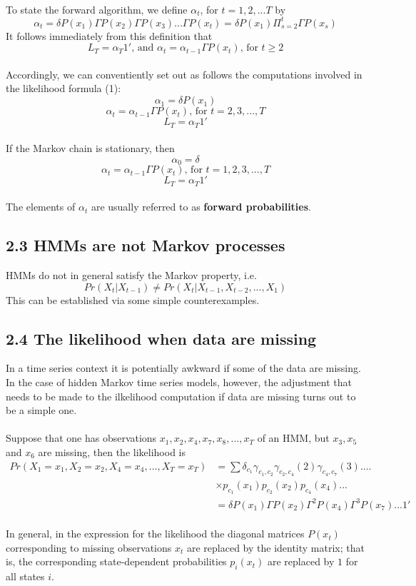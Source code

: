 \documentclass{article}
\begin{document}
\\
To state the forward algorithm, we define $\alpha_t$, for $t =1, 2, ... T$ by 
$$\alpha_t = \delta P(x_1) \Gamma P(x_2) \Gamma P(x_3) ... \Gamma P(x_t) = \delta P(x_1) \Pi_{s=2}^t \Gamma P(x_s)$$
It follows immediately from this definition that
$$L_T = \alpha_T 1' \text{, and } \alpha_t = \alpha_{t-1}\Gamma P(x_t) \text{, for } t \geq 2$$
\\
Accordingly, we can conventiently set out as follows the computations involved in the likelihood formula (1):
$$\alpha_1 = \delta P(x_1)$$
$$\alpha_t = \alpha_{t-1} \Gamma P(x_t) \text{, for } t = 2, 3, ..., T$$
$$L_T = \alpha_T 1'$$
\\
If the Markov chain is stationary, then 
$$\alpha_0 = \delta$$
$$\alpha_t = \alpha_{t-1} \Gamma P(x_t) \text{, for } t = 1, 2, 3, ..., T$$
$$L_T = \alpha_T 1'$$
\\
The elements of $\alpha_t$ are usually referred to as \textbf{forward probabilities}.

\subsection*{2.3 HMMs are not Markov processes}

HMMs do not in general satisfy the Markov property, i.e. 
$$Pr(X_t | X_{t-1}) \neq Pr(X_t | X_{t-1}, X_{t-2}, ... ,X_1)$$
This can be established via some simple counterexamples.

\subsection*{2.4 The likelihood when data are missing}
In a time series context it is potentially awkward if some of the data are missing. In the case of hidden Markov time series models, however, the adjustment that needs to be made to the ilkelihood computation if data are missing turns out to be a simple one. \\
\\
Suppose that one has observations $x_1, x_2, x_4, x_7, x_8, ..., x_T$ of an HMM, but $x_3, x_5$ and $x_6$ are missing, then the likelihood is 
\begin{align}
Pr(X_1 = x_1, X_2 = x_2, X_4 = x_4, ..., X_T = x_T) & = \sum \delta_{c_1} \gamma_{c_1, c_2} \gamma_{c_2, c_4}(2) \gamma_{c_4, c_7} (3) .... \\
& \times p_{c_1}(x_1) p_{c_2}(x_2) p_{c_4}(x_4)... \\
& = \delta P(x_1) \Gamma P(x_2) \Gamma^2 P(x_4) \Gamma^3 P(x_7) ... 1'
\end{align}
\\
In general, in the expression for the likelihood the diagonal matrices $P(x_t)$ corresponding to missing observations $x_t$ are replaced by the identity matrix; that is, the corresponding state-dependent probabilities $p_i(x_t)$ are replaced by $1$ for all states $i$.
\end{document}
